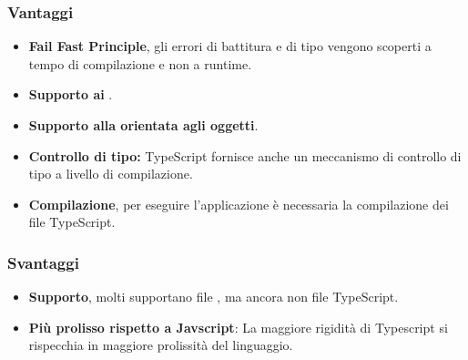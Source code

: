 \subsubsection{Vantaggi}
\begin{itemize}
\item \textbf{Fail Fast Principle}, gli errori di battitura e di tipo vengono scoperti a tempo di compilazione e non a runtime.
\item \textbf{Supporto ai }.
\item \textbf{Supporto alla  orientata agli oggetti}.
\item \textbf{Controllo di tipo:} TypeScript fornisce anche un meccanismo di controllo di tipo a livello di compilazione.
\item \textbf{Compilazione}, per eseguire l'applicazione \`e necessaria la compilazione dei file TypeScript.
\end{itemize}
\subsubsection{Svantaggi}
\begin{itemize}
\item \textbf{Supporto}, molti  supportano file , ma ancora non file TypeScript.
\item \textbf{Più prolisso rispetto a Javscript}: La maggiore rigidità di Typescript si rispecchia in maggiore prolissità del linguaggio.
\end{itemize}
